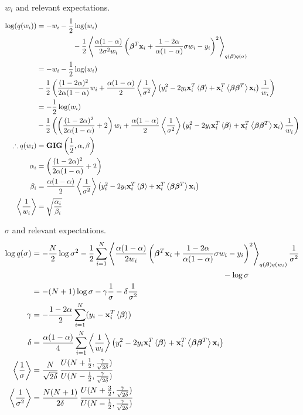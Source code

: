 \documentclass{article}
\begin{document}
$w_i$ and relevant expectations.
\begin{align}
\nonumber
\log (q(w_i))&=-w_i-\frac{1}{2}\log(w_i)\\
\nonumber
&\qquad\qquad\quad-\frac{1}{2}\left\langle\frac{\alpha(1-\alpha)}{2\sigma^2 w_i}\left(\bm{\beta}^T \mathbf{x}_i+\frac{1-2\alpha}{\alpha(1-\alpha)}\sigma w_i-y_i\right)^2\right\rangle_{q(\bm{\beta})q(\sigma)}\\
\nonumber
&=-w_i-\frac{1}{2}\log(w_i)\\
\nonumber&-\frac{1}{2}\left(\frac{(1-2\alpha)^2}{2\alpha(1-\alpha)}w_i+\frac{\alpha(1-\alpha)}{2}\left\langle\frac{1}{\sigma^2}\right\rangle\left(y_i^2-2y_i\mathbf{x}_i^T\left\langle\bm{\beta}\right\rangle+\mathbf{x}_i^T\left\langle\bm{\beta}\bm{\beta}^T\right\rangle\mathbf{x}_i\right)\frac{1}{w_i}\right)\\
\nonumber
&=-\frac{1}{2}\log(w_i)\\
\nonumber&-\frac{1}{2}\left(\left(\frac{(1-2\alpha)^2}{2\alpha(1-\alpha)}+2\right)w_i+\frac{\alpha(1-\alpha)}{2}\left\langle\frac{1}{\sigma^2}\right\rangle\left(y_i^2-2y_i\mathbf{x}_i^T\left\langle\bm{\beta}\right\rangle+\mathbf{x}_i^T\left\langle\bm{\beta}\bm{\beta}^T\right\rangle\mathbf{x}_i\right)\frac{1}{w_i}\right)\\
\therefore q(w_i) & = \mathbf{GIG}\left(\frac{1}{2},\alpha,\beta\right)\\
\alpha_i & =\left(\frac{(1-2\alpha)^2}{2\alpha(1-\alpha)}+2\right) \\
\beta_i & = \frac{\alpha(1-\alpha)}{2}\left\langle\frac{1}{\sigma^2}\right\rangle\left(y_i^2-2y_i\mathbf{x}_i^T\left\langle\bm{\beta}\right\rangle+\mathbf{x}_i^T\left\langle\bm{\beta}\bm{\beta}^T\right\rangle\mathbf{x}_i\right)\\
\left\langle\frac{1}{w_i}\right\rangle&=\sqrt{\frac{\alpha_i}{\beta_i}}
\end{align}

$\sigma$ and relevant expectations.
\begin{align}
\nonumber \log q(\sigma) & =-\frac{N}{2}\log \sigma^2-\frac{1}{2}\sum_{i=1}^{N}\left\langle\frac{\alpha(1-\alpha)}{2 w_i}\left(\bm{\beta}^T \mathbf{x}_i+\frac{1-2\alpha}{\alpha(1-\alpha)}\sigma w_i-y_i\right)^2\right\rangle_{q(\bm{\beta})q(w_i)}\frac{1}{\sigma^2}\\
\nonumber &\qquad\qquad\qquad\qquad\qquad\qquad\qquad\qquad\qquad\qquad\qquad\qquad-\log \sigma\\
\nonumber &=-(N+1)\log \sigma-\gamma\frac{1}{\sigma}-\delta\frac{1}{\sigma^2}\\
\gamma &= -{\frac{1-2\alpha}{2}\sum_{i=1}^{N}(y_i-\mathbf{x}_i^T\left\langle\bm{\beta}\right\rangle)}\\
\delta &=\frac{\alpha(1-\alpha)}{4}\sum_{i=1}^{N}\left\langle\frac{1}{w_i}\right\rangle\left(y_i^2-2y_i\mathbf{x}_i^T\left\langle\bm{\beta}\right\rangle+\mathbf{x}_i^T\left\langle\bm{\beta}\bm{\beta}^T\right\rangle\mathbf{x}_i\right)\\
\left\langle\frac{1}{\sigma}\right\rangle&=\frac{N}{\sqrt{2\delta}}\,\frac{U(N+\frac{1}{2},\frac{\gamma}{\sqrt{2\delta}})}{U(N-\frac{1}{2},\frac{\gamma}{\sqrt{2\delta}})}\\
\left\langle\frac{1}{\sigma^2}\right\rangle&=\frac{N(N+1)}{2\delta}\,\frac{U(N+\frac{3}{2},\frac{\gamma}{\sqrt{2\delta}})}{U(N-\frac{1}{2},\frac{\gamma}{\sqrt{2\delta}})}
\end{align}
\end{document}
